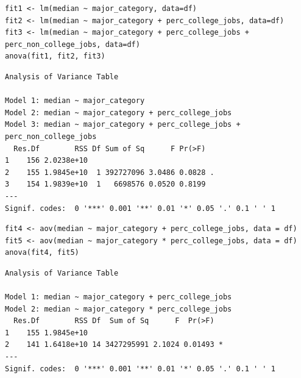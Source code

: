 \documentclass[10pt, twoside, openleft]{article}
\begin{document}
\begin{verbatim}
fit1 <- lm(median ~ major_category, data=df)
fit2 <- lm(median ~ major_category + perc_college_jobs, data=df)
fit3 <- lm(median ~ major_category + perc_college_jobs + perc_non_college_jobs, data=df)
anova(fit1, fit2, fit3)
\end{verbatim}

\begin{verbatim}
Analysis of Variance Table

Model 1: median ~ major_category
Model 2: median ~ major_category + perc_college_jobs
Model 3: median ~ major_category + perc_college_jobs + perc_non_college_jobs
  Res.Df        RSS Df Sum of Sq      F Pr(>F)
1    156 2.0238e+10
2    155 1.9845e+10  1 392727096 3.0486 0.0828 .
3    154 1.9839e+10  1   6698576 0.0520 0.8199
---
Signif. codes:  0 '***' 0.001 '**' 0.01 '*' 0.05 '.' 0.1 ' ' 1
\end{verbatim}

\begin{verbatim}
fit4 <- aov(median ~ major_category + perc_college_jobs, data = df)
fit5 <- aov(median ~ major_category * perc_college_jobs, data = df)
anova(fit4, fit5)
\end{verbatim}

\begin{verbatim}
Analysis of Variance Table

Model 1: median ~ major_category + perc_college_jobs
Model 2: median ~ major_category * perc_college_jobs
  Res.Df        RSS Df  Sum of Sq      F  Pr(>F)
1    155 1.9845e+10
2    141 1.6418e+10 14 3427295991 2.1024 0.01493 *
---
Signif. codes:  0 '***' 0.001 '**' 0.01 '*' 0.05 '.' 0.1 ' ' 1
\end{verbatim}
\end{document}
